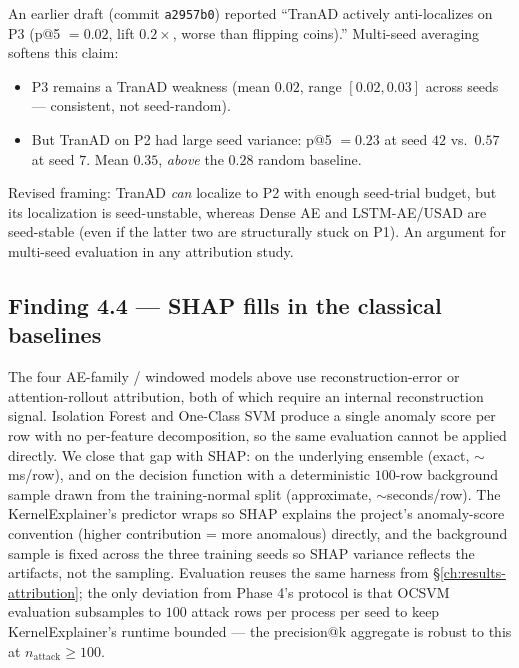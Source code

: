 An earlier draft (commit \texttt{a2957b0}) reported ``TranAD actively anti-localizes on P3 (p@5 $= 0.02$, lift $0.2\times$, worse than flipping coins).''  Multi-seed averaging softens this claim:
\begin{itemize}
  \item P3 remains a TranAD weakness (mean $0.02$, range $[0.02, 0.03]$ across seeds --- consistent, not seed-random).
  \item But TranAD on P2 had large seed variance: p@5 $= 0.23$ at seed $42$ vs.\ $0.57$ at seed $7$.  Mean $0.35$, \emph{above} the $0.28$ random baseline.
\end{itemize}

Revised framing: TranAD \emph{can} localize to P2 with enough seed-trial budget, but its localization is seed-unstable, whereas Dense AE and LSTM-AE/USAD are seed-stable (even if the latter two are structurally stuck on P1).  An argument for multi-seed evaluation in any attribution study.

\subsection{Finding 4.4 --- SHAP fills in the classical baselines}
\label{sec:finding-shap}

The four AE-family / windowed models above use reconstruction-error or attention-rollout attribution, both of which require an internal reconstruction signal.  Isolation Forest and One-Class SVM produce a single anomaly score per row with no per-feature decomposition, so the same evaluation cannot be applied directly.  We close that gap with SHAP:  on the underlying  ensemble (exact, $\sim$ms/row), and  on the  decision function with a deterministic $100$-row background sample drawn from the training-normal split (approximate, $\sim$seconds/row).  The KernelExplainer's predictor wraps  so SHAP explains the project's anomaly-score convention (higher contribution = more anomalous) directly, and the background sample is fixed across the three training seeds so SHAP variance reflects the artifacts, not the sampling.  Evaluation reuses the same  harness from \S\ref{ch:results-attribution}; the only deviation from Phase 4's protocol is that OCSVM evaluation subsamples to $100$ attack rows per process per seed to keep KernelExplainer's runtime bounded --- the precision@k aggregate is robust to this at $n_{\text{attack}} \geq 100$.

